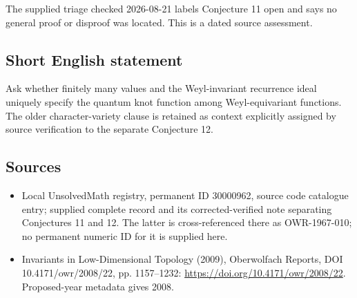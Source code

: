 \documentclass[11pt]{article}
\begin{document}
The supplied triage checked 2026-08-21 labels Conjecture 11 open and says no general proof or disproof was located. This is a dated source assessment.
\subsection{Short English statement}
Ask whether finitely many values and the Weyl-invariant recurrence ideal uniquely specify the quantum knot function among Weyl-equivariant functions. The older character-variety clause is retained as context explicitly assigned by source verification to the separate Conjecture 12.
\subsection{Sources}
\begin{itemize}
\item Local UnsolvedMath registry, permanent ID 30000962, source code catalogue entry; supplied complete record and its corrected-verified note separating Conjectures 11 and 12. The latter is cross-referenced there as OWR-1967-010; no permanent numeric ID for it is supplied here.
\item Invariants in Low-Dimensional Topology (2009), Oberwolfach Reports, DOI 10.4171/owr/2008/22, pp. 1157--1232: \url{https://doi.org/10.4171/owr/2008/22}. Proposed-year metadata gives 2008.
\end{itemize}
\end{document}
